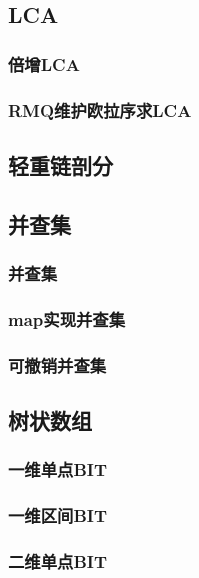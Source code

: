 ﻿\documentclass[a4paper,twocolumn]{article}
\begin{document}
\subsection{LCA}
\subsubsection{倍增LCA}

\subsubsection{RMQ维护欧拉序求LCA}

\subsection{轻重链剖分}
\begin{spacing}{1.5}

\end{spacing}

\subsection{并查集}
\subsubsection{并查集}

\subsubsection{map实现并查集}

\subsubsection{可撤销并查集}

\subsection{树状数组}
\subsubsection{一维单点BIT}

\subsubsection{一维区间BIT}

\subsubsection{二维单点BIT}

\end{document}
